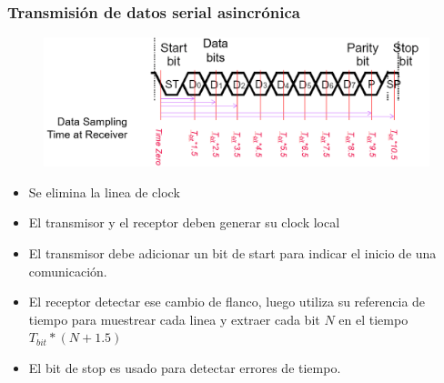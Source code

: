 \documentclass[10.5pt,scale=1.0,t,aspectratio=169,hyperref={pdfpagelabels=false}]{beamer}
\begin{document}
\begin{frame}
	\frametitle{Transmisión de datos serial asincrónica}
	
	\begin{figure}
		\centering
		\includegraphics[scale=0.4]{07_AsyncSerial}
	\end{figure}
	
	\begin{itemize}
		\item Se elimina la linea de clock
		\item El transmisor y el receptor deben generar su clock local
		\item El transmisor debe adicionar un bit de start para indicar el inicio de una comunicación.
		\item El receptor detectar ese cambio de flanco, luego utiliza su referencia de tiempo para muestrear cada linea y extraer cada bit $N$ en el tiempo $T_{bit}*(N+1.5)$
		\item El bit de stop es usado para detectar errores de tiempo. 
	\end{itemize}
	
\end{frame}
\end{document}

